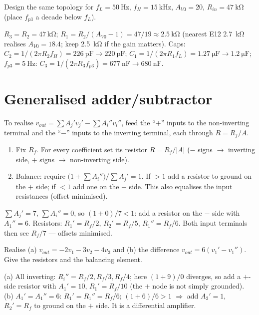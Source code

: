\documentclass[11pt,a4paper,oneside]{book}
\begin{document}
\begin{exercise}
Design the same topology for $f_L=\qty{50}{\hertz}$, $f_H=\qty{15}{\kilo\hertz}$,
$A_{V0}=20$, $R_{in}=\qty{47}{\kilo\ohm}$ (place $f_{p3}$ a decade below $f_L$).
\end{exercise}
\begin{solution}
$R_3=R_2=\qty{47}{\kilo\ohm}$;
$R_1=R_2/(A_{V0}-1)=47/19\approx\qty{2.5}{\kilo\ohm}$ (nearest E12
\qty{2.7}{\kilo\ohm} realises $A_{V0}=18.4$; keep \qty{2.5}{\kilo\ohm} if the
gain matters). Caps: $C_2=1/(2\pi R_2f_H)=\qty{226}{\pico\farad}\to
\qty{220}{\pico\farad}$; $C_1=1/(2\pi R_1f_L)=\qty{1.27}{\micro\farad}\to
\qty{1.2}{\micro\farad}$; $f_{p3}=\qty{5}{\hertz}$:
$C_3=1/(2\pi R_3f_{p3})=\qty{677}{\nano\farad}\to\qty{680}{\nano\farad}$.
\end{solution}

\section{Generalised adder/subtractor}
To realise $v_{out}=\sum A_j' v_j' - \sum A_i'' v_i''$, feed the ``$+$'' inputs to
the non-inverting terminal and the ``$-$'' inputs to the inverting terminal,
each through $R=R_f/A$.

\begin{protocol}
\begin{enumerate}[leftmargin=1.5cm]
  \item Fix $R_f$. For every coefficient set its resistor $R=R_f/|A|$
        ($-$ signs $\to$ inverting side, $+$ signs $\to$ non-inverting side).
  \item Balance: require $\bigl(1+\sum A_i''\bigr)/\sum A_j'=1$. If $>1$ add a
        resistor to ground on the $+$ side; if $<1$ add one on the $-$ side.
        This also equalises the input resistances (offset minimised).
\end{enumerate}
\end{protocol}

\begin{wexample}[$v_{out}=2v_1'+5v_2'$]
$\sum A_j'=7$, $\sum A_i''=0$, so $(1+0)/7<1$: add a resistor on the $-$ side
with $A_1''=6$. Resistors: $R_1'=R_f/2$, $R_2'=R_f/5$, $R_1''=R_f/6$. Both input
terminals then see $R_f/7$ --- offsets minimised.
\end{wexample}

\begin{exercise}
Realise (a) $v_{out}=-2v_1-3v_2-4v_3$ and (b) the difference
$v_{out}=6(v_1'-v_1'')$. Give the resistors and the balancing element.
\end{exercise}
\begin{solution}
(a) All inverting: $R_i''=R_f/2,R_f/3,R_f/4$; here $(1+9)/0$ diverges, so add a
$+$-side resistor with $A_1'=10$, $R_1'=R_f/10$ (the $+$ node is not simply
grounded). (b) $A_1'=A_1''=6$: $R_1'=R_1''=R_f/6$; $(1+6)/6>1$ $\Rightarrow$ add
$A_2'=1$, $R_2'=R_f$ to ground on the $+$ side. It is a differential amplifier.
\end{solution}
\end{document}

